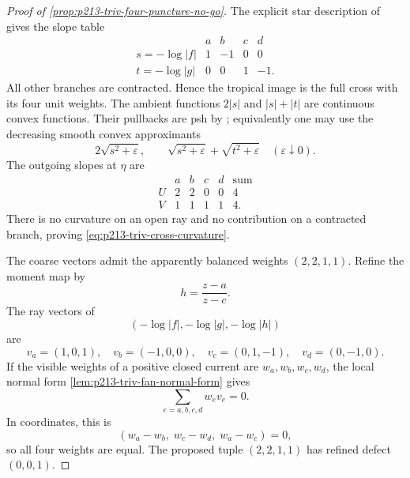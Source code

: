 \begin{proof}[Proof of \cref{prop:p213-triv-four-puncture-no-go}]
The explicit star description of \cite[\S6.7.3]{CLD25} gives the slope
table
\begin{equation}
\begin{array}{c|rrrr}
 &a&b&c&d\\ \hline
 s=-\log|f|&1&-1&0&0\\
 t=-\log|g|&0&0&1&-1.
\end{array}
\label{eq:p213-triv-cross-slopes}
\end{equation}
All other branches are contracted.  Hence the tropical image is the full
cross with its four unit weights.  The ambient functions \(2|s|\) and
\(|s|+|t|\) are continuous convex functions.  Their pullbacks are psh by
\cite[Proposition~8.2.5]{CLD25}; equivalently one may use the decreasing
smooth convex approximants
\begin{equation}
 2\sqrt{s^2+\varepsilon},
 \qquad
 \sqrt{s^2+\varepsilon}+\sqrt{t^2+\varepsilon}
 \quad(\varepsilon\downarrow0).
\label{eq:p213-triv-cross-approximants}
\end{equation}
The outgoing slopes at \(\eta\) are
\begin{equation}
\begin{array}{c|rrrr|c}
 &a&b&c&d&\text{sum}\\ \hline
 U&2&2&0&0&4\\
 V&1&1&1&1&4.
\end{array}
\label{eq:p213-triv-cross-potential-slopes}
\end{equation}
There is no curvature on an open ray and no contribution on a contracted
branch, proving \eqref{eq:p213-triv-cross-curvature}.

The coarse vectors admit the apparently balanced weights
\((2,2,1,1)\).  Refine the moment map by
\[
                         h=\frac{z-a}{z-c}.
\]
The ray vectors of
\[
 (-\log|f|,-\log|g|,-\log|h|)
\]
are
\begin{equation}
 v_a=(1,0,1),\quad v_b=(-1,0,0),\quad
 v_c=(0,1,-1),\quad v_d=(0,-1,0).
\label{eq:p213-triv-refined-rays}
\end{equation}
If the visible weights of a positive closed current are
\(w_a,w_b,w_c,w_d\), the local normal form
\cref{lem:p213-triv-fan-normal-form} gives
\begin{equation}
                       \sum_{e=a,b,c,d}w_ev_e=0.
\label{eq:p213-triv-refined-balance}
\end{equation}
In coordinates, this is
\begin{equation}
                    (w_a-w_b,\;w_c-w_d,\;w_a-w_c)=0,
\label{eq:p213-triv-refined-equalities}
\end{equation}
so all four weights are equal.  The proposed tuple \((2,2,1,1)\) has
refined defect \((0,0,1)\).


\end{proof}
